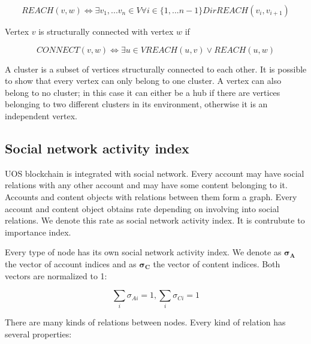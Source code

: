 \documentclass[a4paper,12pt]{article}
\begin{document}

$$
REACH(v,w) \Leftrightarrow \exists v_1,...v_n \in V \forall i \in \{1,...n-1\}DirREACH(v_i,v_{i+1})
$$

Vertex $v$ is structurally connected with vertex $w$ if


$$
CONNECT(v,w) \Leftrightarrow \exists u \in V REACH(u,v) \vee REACH(u,w)
$$

A cluster is a subset of vertices structurally connected to each other. It is possible to show that every vertex can only belong to one cluster. A vertex can also belong to no cluster; in this case it can either be a hub if there are vertices belonging to two different clusters in its environment, otherwise it is an independent vertex.


\subsection{Social network activity index}

UOS blockchain is integrated with social network. Every account may have social relations with any other account and may have some content belonging to it. Accounts and content objects with relations between them form a graph. Every account and content object obtains rate depending on involving into social relations. We denote this rate as social network activity index. It is contrubute to importance index.

Every type of node has its own social network activity index. We denote as $\boldsymbol{\sigma_A}$ the vector of account indices and as $\boldsymbol{\sigma_C}$ the vector of content indices. Both vectors are normalized to 1:

$$
\sum_i{\sigma_{Ai}} = 1, \sum_i{\sigma_{Ci}} = 1
$$

There are many kinds of relations between nodes. Every kind of relation has several properties:
\end{document}
